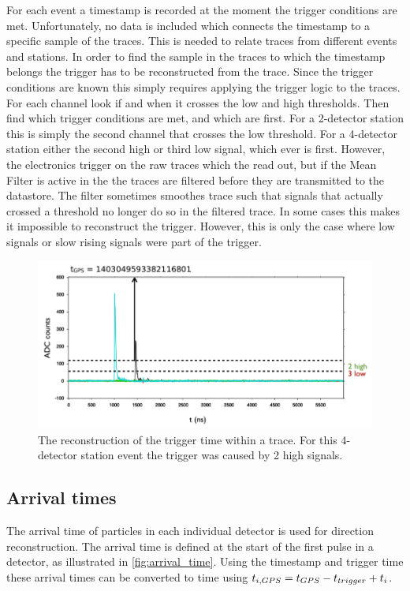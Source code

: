 For each event a \gps timestamp is recorded at the moment the trigger conditions are met. Unfortunately, no data is included which connects the \gps timestamp to a specific sample of the traces. This is needed to relate traces from different events and stations. In order to find the sample in the traces to which the \gps timestamp belongs the trigger has to be reconstructed from the trace. Since the trigger conditions are known this simply requires applying the trigger logic to the traces. For each channel look if and when it crosses the low and high thresholds. Then find which trigger conditions are met, and which are first. For a 2-detector station this is simply the second channel that crosses the low threshold. For a 4-detector station either the second high or third low signal, which ever is first. However, the \hisparc electronics trigger on the raw traces which the \adcs read out, but if the Mean Filter is active in the \daq the traces are filtered before they are transmitted to the datastore. The filter sometimes smoothes trace such that signals that actually crossed a threshold no longer do so in the filtered trace. In some cases this makes it impossible to reconstruct the trigger. However, this is only the case where low signals or slow rising signals were part of the trigger.

\begin{figure}
    \centering
    \includegraphics[width=0.7\linewidth]{plots/processing/trigger_time.png}
    \caption{The reconstruction of the trigger time within a trace. For this 4-detector station event the trigger was caused by 2 high signals.}
    \label{fig:trigger_time}
\end{figure}


\subsection{Arrival times}

The arrival time of particles in each individual detector is used for direction  reconstruction. The arrival time is defined at the start of the first pulse in a detector, as illustrated in \cref{fig:arrival_time}. Using the \gps timestamp and trigger time these arrival times can be converted to \gps time using $t_{i,\gps} = t_{\gps} - t_{trigger} + t_i$.

